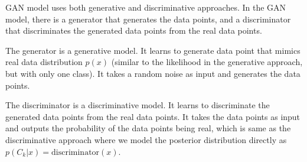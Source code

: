 \documentclass[a4paper,12pt]{article}
\begin{document}
GAN model uses both generative and discriminative approaches. In the GAN model, there is a generator that generates the data points, and a discriminator that discriminates the generated data points from the real data points.

The generator is a generative model. It learns to generate data point that mimics real data distribution $p(x)$  (similar to the likelihood in the generative approach, but with only one class). It takes a random noise as input and generates the data points.

The discriminator is a discriminative model. It learns to discriminate the generated data points from the real data points. It takes the data points as input and outputs the probability of the data points being real, which is same as the discriminative approach where we model the posterior distribution directly as $p(C_k|x) = \text{discriminator}(x)$.
\end{document}
